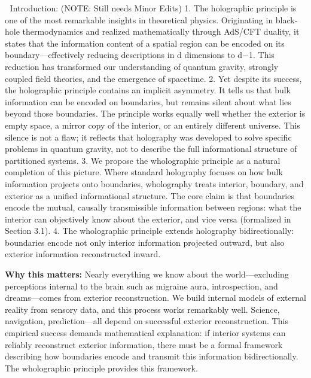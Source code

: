 ﻿\documentclass[12pt]{article}
\begin{document}
📍 Introduction: (NOTE: Still needs Minor Edits)
1.
 The holographic principle is one of the most remarkable insights in theoretical physics. Originating in black-hole thermodynamics and realized mathematically through AdS/CFT duality, it states that the information content of a spatial region can be encoded on its boundary—effectively reducing descriptions in d dimensions to d−1. This reduction has transformed our understanding of quantum gravity, strongly coupled field theories, and the emergence of spacetime.
2.
 Yet despite its success, the holographic principle contains an implicit asymmetry. It tells us that bulk information can be encoded on boundaries, but remains silent about what lies beyond those boundaries. The principle works equally well whether the exterior is empty space, a mirror copy of the interior, or an entirely different universe. This silence is not a flaw; it reflects that holography was developed to solve specific problems in quantum gravity, not to describe the full informational structure of partitioned systems.
3.
 We propose the wholographic principle as a natural completion of this picture. Where standard holography focuses on how bulk information projects onto boundaries, wholography treats interior, boundary, and exterior as a unified informational structure. The core claim is that boundaries encode the mutual, causally transmissible information between regions: what the interior can objectively know about the exterior, and vice versa (formalized in Section 3.1).
4.  
The wholographic principle extends holography bidirectionally: boundaries encode not only interior information projected outward, but also exterior information reconstructed inward. 


\textbf{Why this matters:} Nearly everything we know about the world—excluding perceptions internal to the brain such as migraine aura, introspection, and dreams—comes from exterior reconstruction. We build internal models of external reality from sensory data, and this process works remarkably well. Science, navigation, prediction—all depend on successful exterior reconstruction. This empirical success demands mathematical explanation: if interior systems can reliably reconstruct exterior information, there must be a formal framework describing how boundaries encode and transmit this information bidirectionally. The wholographic principle provides this framework.
\end{document}
